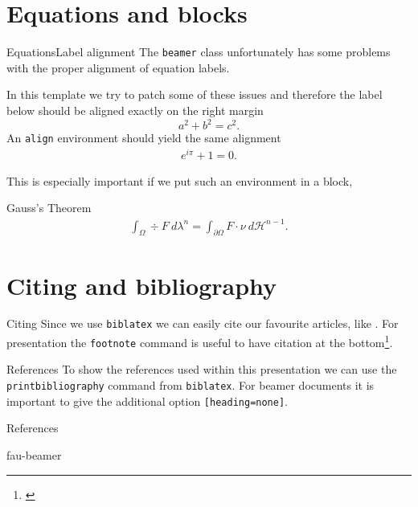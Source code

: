 \section{Equations and blocks}
%
%
%
%
%
\begin{frame}{Equations}{Label alignment}
The \texttt{beamer} class unfortunately has some problems with the proper 
alignment of equation labels.

%
\pause
%
In this template we try to patch some of these issues and therefore the label 
below should be aligned exactly on the right margin
%
\begin{equation}\label{eq:pythagoras}
a^2 + b^2 = c^2.
\end{equation}
%
An \texttt{align} environment should yield the same alignment
%
\begin{align}\label{eq:euler}
e^{i\pi} +1= 0.
\end{align}

This is especially important if we put such an environment in a block,

\begin{block}{Gauss's Theorem}
\begin{align}\label{eq:gauss}
\int_\Omega \div F\ d\lambda^n = \int_{\partial\Omega} F\cdot \nu\ d\mathcal{H}^{n-1}.
\end{align}
\end{block}
\end{frame}
\section{Citing and bibliography}
%
%
%
%
%
\begin{frame}{Citing}
Since we use \texttt{biblatex} we can easily cite our favourite articles, like
\cite{bungert2021bregman, bungert2021neural}. For presentation the \texttt{footnote} command is useful to have citation at the bottom\footnote{\cite{bungert2021bregman}}.
\end{frame}
%
%
%
%
%
\begin{frame}{References}
To show the references used within this presentation we can use the \texttt{printbibliography} command from \texttt{biblatex}. For beamer documents it is important to give the additional option \texttt{[heading=none]}.
%
%
%
%
%
\begin{block}{References}
\printbibliography[heading=none]
\end{block}
\end{frame}
%
%
%
%
%
\begin{frame}{fau-beamer}
%
\end{frame}
